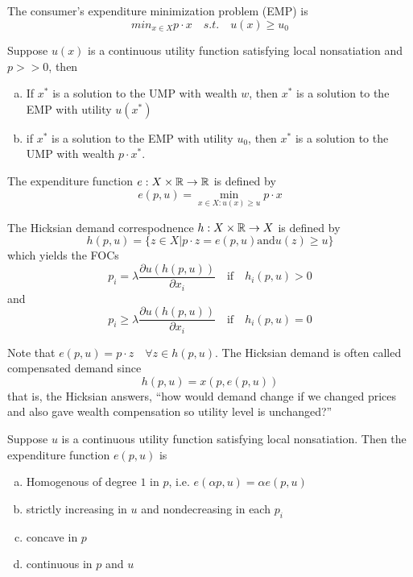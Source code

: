 

\begin{definition}[EMP]
  The consumer's expenditure minimization problem (EMP) is
  \[
  min_{x \in X} p \cdot x \quad s.t. \quad u(x) \geq u_0
  \]
\end{definition}

\begin{prop}
  Suppose $u(x)$ is a continuous utility function satisfying local
  nonsatiation and $p >> 0$, then
  \begin{enumerate}[(a)]
  \item If $x^*$ is a solution to the UMP with wealth $w$, then $x^*$
    is a solution to the EMP with utility $u(x^*)$
  \item if $x^*$ is a solution to the EMP with utility $u_0$, then
    $x^*$ is a solution to the UMP with wealth $p \cdot x^*$.
  \end{enumerate}
\end{prop}

\begin{definition}
  The expenditure function $e : X \times {\mathbb R} \to {\mathbb R}$ is defined by
  \[
  e(p, u) = \min_{x \in X: u(x) \geq u} p \cdot x
  \]
\end{definition}

\begin{definition}
  The Hicksian demand correspodnence $h : X \times {\mathbb R} \to X$ is
  defined by 
  \[
  h(p,u) = \{ z \in X | p \cdot z = e(p,u) \text{and} u(z) \geq u \}
  \]
  which yields the FOCs
  \[
  p_i  = \lambda \frac{\partial u(h(p,u))}{\partial x_i} 
  \quad \text{if} \quad  h_i(p,u) > 0
  \]
  and
  \[
  p_i  \geq \lambda \frac{\partial u(h(p,u))}{\partial x_i} 
  \quad \text{if} \quad h_i(p,u) = 0
  \]
\end{definition}

Note that $e(p,u) = p \cdot z \quad \forall z \in h(p,u)$. The
Hicksian demand is often called compensated demand since
\[
h(p,u) = x(p, e(p,u))
\]
that is, the Hicksian answers, ``how would demand change if we changed
prices and also gave wealth compensation so utility level is
unchanged?''


\begin{prop}
  Suppose $u$ is a continuous utility function satisfying local
  nonsatiation. Then the expenditure function $e(p,u)$ is
  \begin{enumerate}[(a)]
  \item Homogenous of degree $1$ in $p$, i.e. $e(\alpha p, u) = \alpha
    e(p,u)$
  \item strictly increasing in $u$ and nondecreasing in each $p_i$
  \item concave in $p$
  \item continuous in $p$ and $u$
  \end{enumerate}
\end{prop}


